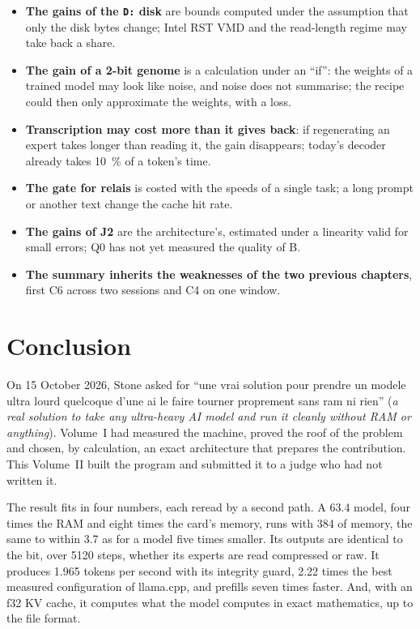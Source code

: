 \begin{faux}
\begin{itemize}
\item \textbf{The gains of the \texttt{D:} disk} are bounds computed under the assumption that only the disk bytes change; Intel RST VMD and the read-length regime may take back a share.
\item \textbf{The gain of a 2-bit genome} is a calculation under an ``if'': the weights of a trained model may look like noise, and noise does not summarise; the recipe could then only approximate the weights, with a loss.
\item \textbf{Transcription may cost more than it gives back}: if regenerating an expert takes longer than reading it, the gain disappears; today's decoder already takes \SI{10}{\percent} of a token's time.
\item \textbf{The gate for relais} is costed with the speeds of a single task; a long prompt or another text change the cache hit rate.
\item \textbf{The gains of J2} are the architecture's, estimated under a linearity valid for small errors; Q0 has not yet measured the quality of B.
\item \textbf{The summary inherits the weaknesses of the two previous chapters}, first C6 across two sessions and C4 on one window.
\end{itemize}
\end{faux}

\chapter*{Conclusion}\label{t2d-ch:conclusion}

On 15 October 2026, Stone asked for ``une vrai solution pour prendre un modele ultra lourd quelcoque d'une ai le faire tourner proprement sans ram ni rien'' (\emph{a real solution to take any ultra-heavy AI model and run it cleanly without RAM or anything}). Volume~I had measured the machine, proved the roof of the problem and chosen, by calculation, an exact architecture that prepares the contribution. This Volume~II built the program and submitted it to a judge who had not written it.

The result fits in four numbers, each reread by a second path. A \SI{63.4}{\Go} model, four times the RAM and eight times the card's memory, runs with \SI{384}{\Mo} of memory, the same to within \SI{3.7}{\Mo} as for a model five times smaller. Its outputs are identical to the bit, over \num{5120} steps, whether its experts are read compressed or raw. It produces \num{1.965} tokens per second with its integrity guard, \num{2.22} times the best measured configuration of llama.cpp, and prefills seven times faster. And, with an f32 KV cache, it computes what the model computes in exact mathematics, up to the file format.

